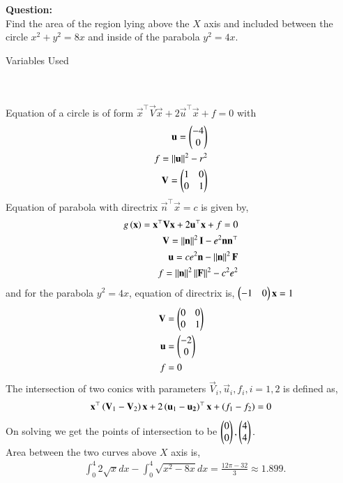 \documentclass[journal]{IEEEtran}
\begin{document}
\textbf{Question:}\\
Find the area of the region lying above the $X$ axis and included between the circle $x^2+y^2=8x$ and inside of the parabola $y^2=4x$. \hfill {}
\begin{table}[h!] 
  \centering
  
  \caption{Variables Used}
  \label{tab9-5.6-1}
\end{table}\\
\solution\\
Equation of a circle is of form $\vec{x}^{\top}\vec{V}\vec{x}+2\vec{u}^{\top}\vec{x}+f=0$ with
\begin{align}
	\mathbf{u}=\begin{pmatrix}-4\\0\end{pmatrix}\\
	f=\left\lVert\mathbf{u}\right\rVert^2-r^2\\
	\mathbf{V}=\begin{pmatrix}1&0\\0&1\end{pmatrix}
\end{align}
Equation of parabola with directrix $\vec{n}^{\top}\vec{x}=c$ is given by,
\begin{align}
	g\left(\mathbf{x}\right)=\mathbf{x}^{\top}\mathbf{V}\mathbf{x}+2\mathbf{u}^{\top}\mathbf{x}+f=0\\
	\mathbf{V}=\left\lVert\mathbf{n}\right\rVert^2\mathbf{I}-e^2\mathbf{n}\mathbf{n}^{\top}\\
	\mathbf{u}=ce^2\mathbf{n}-\left\lVert\mathbf{n}\right\rVert^2\mathbf{F}\\
	f=\left\lVert\mathbf{n}\right\rVert^2\left\lVert\mathbf{F}\right\rVert^2-c^2e^2
\end{align}
and for the parabola $y^2=4x$, equation of directrix is, $\begin{pmatrix}-1&0\end{pmatrix}\mathbf{x}=1$
\begin{align}
	\mathbf{V}&=\begin{pmatrix}0&0\\0&1\end{pmatrix}\\
	\mathbf{u}&=\begin{pmatrix}-2\\0\end{pmatrix}\\
	f&=0
\end{align}
The intersection of two conics with parameters $\vec{V}_i,\vec{u}_i,f_i, i=1,2$ is defined as,
\begin{align}
	\mathbf{x}^{\top}\left(\mathbf{V}_1-\mathbf{V}_2\right)\mathbf{x}+2\left(\mathbf{u}_1-\mathbf{u_2}\right)^{\top}\mathbf{x}+\left(f_1-f_2\right)=0
\end{align} 
On solving we get the points of intersection to be $\begin{pmatrix}0\\0\end{pmatrix},\begin{pmatrix}4\\4\end{pmatrix}.$\\
Area between the two curves above $X$ axis is,
\begin{align}
	&\int_0^4 2\sqrt{x} dx- \int_0^4 \sqrt{x^2-8x} dx = \frac{12\pi-32}{3} \approx 1.899.
\end{align}
\end{document}

